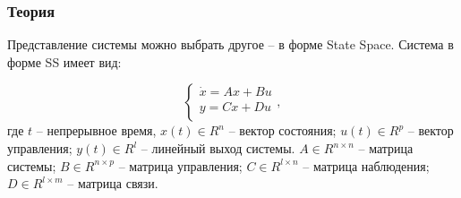 \documentclass[16pt]{article}
\begin{document}
\subsubsection{Теория}
Представление системы можно выбрать другое -- в форме State Space. Система в форме SS имеет вид:

\[ 
    \begin{cases}
        \dot{x} = Ax + Bu \\
        y = Cx + Du \\
    \end{cases},
\]
где \( t \) -- непрерывное время, \(x(t) \in R^n\) -- вектор состояния; \(u(t) \in R^p\) -- вектор управления; \(y(t) \in R^l\) -- линейный выход системы.
\( A \in R^{n \times n}\) -- матрица системы; \( B \in R^{n \times p}\) -- матрица управления; \( C \in R^{l \times n}\) -- матрица наблюдения; \( D \in R^{l \times m}\) -- матрица связи. \\
\end{document}

